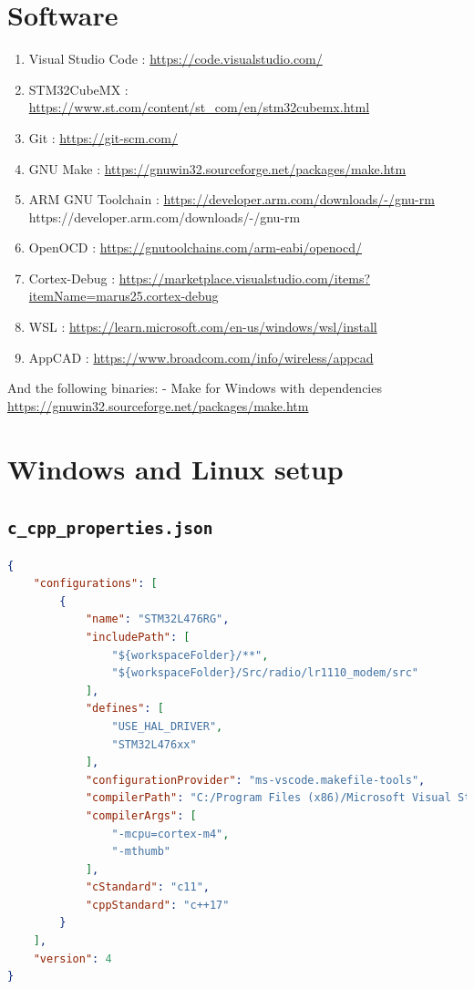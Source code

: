 \begin{appendices}
\section{Software}  \label{app:software}
\begin{enumerate}
    \item Visual Studio Code : \url{https://code.visualstudio.com/} \label{app:software:vsc}
    \item STM32CubeMX : \url{https://www.st.com/content/st_com/en/stm32cubemx.html} \label{app:software:stm32cubemx}
    \item Git : \url{https://git-scm.com/} \label{app:software:git}
    \item GNU Make : \url{https://gnuwin32.sourceforge.net/packages/make.htm} \label{app:software:make}
    \item ARM GNU Toolchain : \url{https://developer.arm.com/downloads/-/gnu-rm}
    https://developer.arm.com/downloads/-/gnu-rm
    \label{app:software:arm_toolchain}
    \item OpenOCD : \url{https://gnutoolchains.com/arm-eabi/openocd/} \label{app:software:openocd}
    \item Cortex-Debug : \url{https://marketplace.visualstudio.com/items?itemName=marus25.cortex-debug} \label{app:software:cortex_debug}
    \item WSL : \url{https://learn.microsoft.com/en-us/windows/wsl/install} \label{app:software:wsl}
    \item AppCAD : \url{https://www.broadcom.com/info/wireless/appcad} \label{app:software:appcad}
\end{enumerate}

And the following binaries:
- Make for Windows with dependencies \url{https://gnuwin32.sourceforge.net/packages/make.htm} 

\section{Windows and Linux setup}
\subsection*{\lstinline[style=bash]{c_cpp_properties.json}} \label{app:software:c_cpp_properties}
\begin{lstlisting}[language=json]
{
    "configurations": [
        {
            "name": "STM32L476RG",
            "includePath": [
                "${workspaceFolder}/**",
                "${workspaceFolder}/Src/radio/lr1110_modem/src"
            ],
            "defines": [
                "USE_HAL_DRIVER",
                "STM32L476xx"
            ],
            "configurationProvider": "ms-vscode.makefile-tools",
            "compilerPath": "C:/Program Files (x86)/Microsoft Visual Studio/2022/BuildTools/VC/Tools/MSVC/14.38.33130/bin/Hostx64/x64/cl.exe", // Use "which arm-none-eabi-gcc" to get the location of the compiler in linux
            "compilerArgs": [
                "-mcpu=cortex-m4",
                "-mthumb"
            ],
            "cStandard": "c11",
            "cppStandard": "c++17"
        }
    ],
    "version": 4
}
\end{lstlisting}


\end{appendices}
